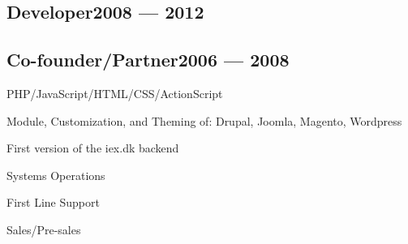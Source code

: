 \subsection{{Developer\hfill 2008 --- 2012}}
\subsection{{Co-founder/Partner\hfill 2006 --- 2008}}
\begin{zitemize}
    \item PHP/JavaScript/HTML/CSS/ActionScript
    \item Module, Customization, and Theming of: Drupal, Joomla, Magento, Wordpress
    \item First version of the iex.dk backend
    \item Systems Operations
    \item First Line Support
    \item Sales/Pre-sales
\end{zitemize}

